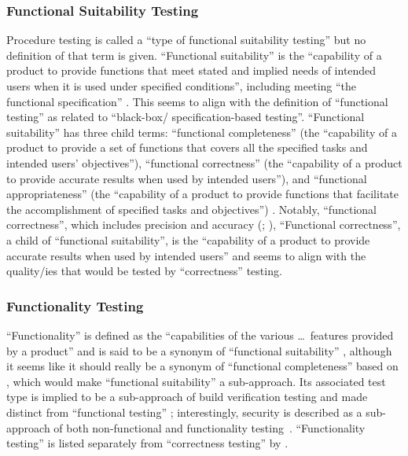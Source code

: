 
\subsubsection{Functional Suitability Testing}
Procedure testing is
called a ``type of functional suitability testing''
\citep[p.~7]{IEEE2022} but no definition of that term is given.
``Functional suitability'' is the
``capability of a product to provide functions that meet stated and
implied needs of intended users when it is used under specified
conditions'', including meeting ``the functional specification''
\citep{ISO_IEC2023a}. This seems to align with the definition of
``functional testing'' as related to ``black-box/%
specification-based testing''.
\ifnotpaper
    ``Functional suitability'' has
    three child terms: ``functional completeness'' (the ``capability of
    a product to provide a set of functions that covers all the
    specified tasks and intended users' objectives''), ``functional
    correctness'' (the ``capability of a product to provide accurate
    results when used by intended users''), and ``functional
    appropriateness'' (the ``capability of a product to provide
    functions that facilitate the accomplishment of specified tasks and
    objectives'') \citep{ISO_IEC2023a}. Notably, ``functional
    correctness'', which includes precision and accuracy
    (\citealp{ISO_IEC2023a}; \citealpISTQB{}), \else ``Functional
    correctness'', a child of ``functional suitability'', is the ``capability
    of a product to provide accurate results when used by intended users''
    \cite{ISO_IEC2023a} and \fi seems to align with
the quality/ies that would be tested by ``correctness'' testing.

\subsubsection{Functionality Testing}
``Functionality'' is defined as the
``capabilities of the various \dots\ features provided by a product''
\citep[p.~196]{IEEE2017} and is said to be a synonym of
``functional suitability'' \citepISTQB{}, although it seems
like it should really be a synonym of ``functional completeness'' based on
\citep{ISO_IEC2023a}, which would make ``functional suitability'' a
sub-approach. Its associated test type
is implied to be a sub-approach of build verification testing
\citepISTQB{} and made distinct from ``functional testing''%
\ifnotpaper; interestingly, security is described as a sub-approach of both
non-functional and functionality testing\fi\ \citep[Tab.~2]{Gerrard2000a}.
``Functionality testing'' is listed separately from ``correctness testing'' by
\citet[p.~53]{Firesmith2015}.

